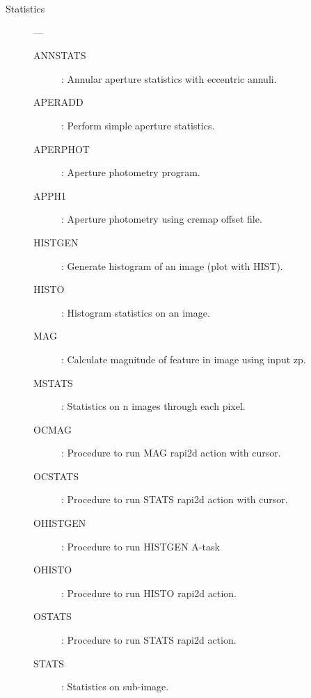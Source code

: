 \begin{description}
\item [Statistics] ---
\begin{description}
\item [ANNSTATS] : Annular aperture statistics with eccentric annuli.
\item [APERADD] : Perform simple aperture statistics.
\item [APERPHOT] : Aperture photometry program.
\item [APPH1] : Aperture photometry using cremap offset file.
\item [HISTGEN] : Generate histogram of an image (plot with HIST).
\item [HISTO] : Histogram statistics on an image.
\item [MAG] : Calculate magnitude of feature in image using input zp.
\item [MSTATS] : Statistics on n images through each pixel.
\item [OCMAG] : Procedure to run MAG rapi2d action with cursor.
\item [OCSTATS] : Procedure to run STATS rapi2d action with cursor.
\item [OHISTGEN] : Procedure to run HISTGEN A-task
\item [OHISTO] : Procedure to run HISTO rapi2d action.
\item [OSTATS] : Procedure to run STATS rapi2d action.
\item [STATS] : Statistics on sub-image.
\end{description}


\end{description}
